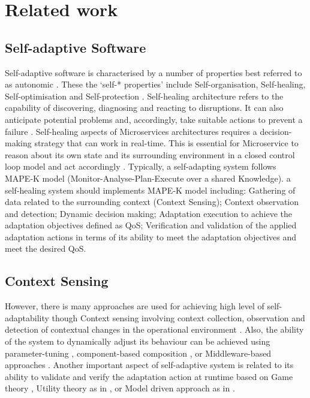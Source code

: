 \section{Related work}
\label{sec:related-work}
\subsection{Self-adaptive Software}
Self-adaptive software is characterised by a number of properties best referred to as autonomic \cite{jelasityself}. These the `self-* properties' include Self-organisation, Self-healing, Self-optimisation and Self-protection  \cite{horn:2001p3735}. Self-healing architecture refers to  the capability of discovering, diagnosing and reacting to disruptions. It can also anticipate potential problems and, accordingly, take suitable actions to prevent a failure \cite{horn:2001p3735}. Self-healing aspects of Microservices architectures requires a decision-making strategy that can work in real-time. This is essential for Microservice to reason about its own state and its surrounding environment in a closed control loop model and act accordingly \cite{Cheng:2008p3708}.  
Typically, a self-adapting system follows MAPE-K model (Monitor-Analyse-Plan-Execute over a shared Knowledge). a self-healing system should implements MAPE-K model including: Gathering of data related to the surrounding context (Context Sensing); Context observation and detection; Dynamic decision making; Adaptation execution to achieve the adaptation objectives defined as QoS; Verification and validation of the applied adaptation actions in terms of its ability to meet the adaptation objectives and meet the desired QoS.
\subsection{Context Sensing}

 However, there is many approaches are used for achieving high level of self-adaptability though Context sensing involving context collection, observation and detection of contextual changes in the operational environment \cite{Strang:2004p3770}. Also, the ability of the system to dynamically adjust its behaviour can be achieved using parameter-tuning \cite{Cheng:2009p3902}, component-based composition \cite{MariusMikalsen:2005ur}, or Middleware-based  approaches \cite{CheungFooWo:2007p1692}. Another important aspect of self-adaptive system is related to its ability to validate and verify the adaptation action at runtime based on Game theory \cite{Wei:2016ge}, Utility theory as in \cite{Menasce:2007vq,KonstantinosKakousis:2008ub}, or Model driven approach as in \cite{Sama:2008p3765}.

